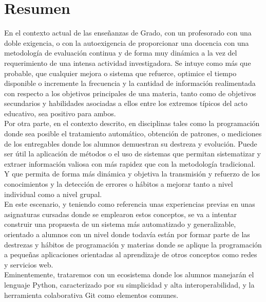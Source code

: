 
\chapter*{Resumen}

En el contexto actual de las enseñanzas de Grado, con un profesorado con una doble exigencia, o con la autoexigencia de proporcionar una docencia con una metodología de evaluación continua y de forma muy dinámica a la vez del requerimiento de una intensa actividad investigadora. Se intuye como más que probable, que cualquier mejora o sistema que refuerce, optimice el tiempo disponible o incremente la frecuencia y la cantidad de información realimentada con respecto a los objetivos principales de una materia, tanto como de objetivos secundarios y habilidades asociadas a ellos entre los extremos típicos del acto educativo, sea positivo para ambos.\\


Por otra parte, en el contexto descrito, en disciplinas tales como la programación donde sea posible el tratamiento automático, obtención de patrones, o mediciones de los entregables donde los alumnos demuestran su destreza y evolución. Puede ser útil la aplicación de métodos o el uso de sistemas que permitan sistematizar y extraer información valiosa con más rapidez que con la metodología tradicional. Y que permita de forma más dinámica y objetiva la transmisión y refuerzo de los conocimientos y la detección de errores o hábitos a mejorar tanto a nivel individual como a nivel grupal.\\


En este escenario, y teniendo como referencia unas experiencias previas en unas asignaturas cursadas donde se emplearon estos conceptos, se va a intentar construir una propuesta de un sistema más automatizado y generalizable, orientado a alumnos con un nivel donde todavía están por formar parte de las destrezas y hábitos de programación y materias donde se aplique la programación a pequeñas aplicaciones  orientadas al aprendizaje de otros conceptos como redes y servicios web.\\


Eminentemente, trataremos con un ecosistema donde los alumnos manejarán el lenguaje Python, caracterizado por su simplicidad y alta interoperabilidad, y la herramienta colaborativa Git como elementos comunes.



